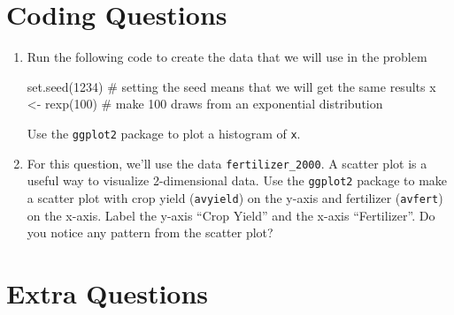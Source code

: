 \documentclass[
  letterpaper,
  DIV=11,
  numbers=noendperiod]{scrreprt}
\newenvironment{Shaded}{\begin{snugshade}}{\end{snugshade}}
\newcommand{\CommentTok}[1]{\textcolor[rgb]{0.37,0.37,0.37}{#1}}
\newcommand{\DecValTok}[1]{\textcolor[rgb]{0.68,0.00,0.00}{#1}}
\newcommand{\FunctionTok}[1]{\textcolor[rgb]{0.28,0.35,0.67}{#1}}
\newcommand{\NormalTok}[1]{\textcolor[rgb]{0.00,0.23,0.31}{#1}}
\newcommand{\OtherTok}[1]{\textcolor[rgb]{0.00,0.23,0.31}{#1}}
\begin{document}
\section{Coding Questions}\label{coding-questions}

\begin{enumerate}
\def\labelenumi{\arabic{enumi}.}
\item
  Run the following code to create the data that we will use in the
  problem

\begin{Shaded}
\begin{Highlighting}[]
\FunctionTok{set.seed}\NormalTok{(}\DecValTok{1234}\NormalTok{) }\CommentTok{\# setting the seed means that we will get the same results}
\NormalTok{x }\OtherTok{\textless{}{-}} \FunctionTok{rexp}\NormalTok{(}\DecValTok{100}\NormalTok{) }\CommentTok{\# make 100 draws from an exponential distribution}
\end{Highlighting}
\end{Shaded}

  Use the \texttt{ggplot2} package to plot a histogram of \texttt{x}.
\item
  For this question, we'll use the data \texttt{fertilizer\_2000}. A
  scatter plot is a useful way to visualize 2-dimensional data. Use the
  \texttt{ggplot2} package to make a scatter plot with crop yield
  (\texttt{avyield}) on the y-axis and fertilizer (\texttt{avfert}) on
  the x-axis. Label the y-axis ``Crop Yield'' and the x-axis
  ``Fertilizer''. Do you notice any pattern from the scatter plot?
\end{enumerate}

\section{Extra Questions}\label{extra-questions}
\end{document}
